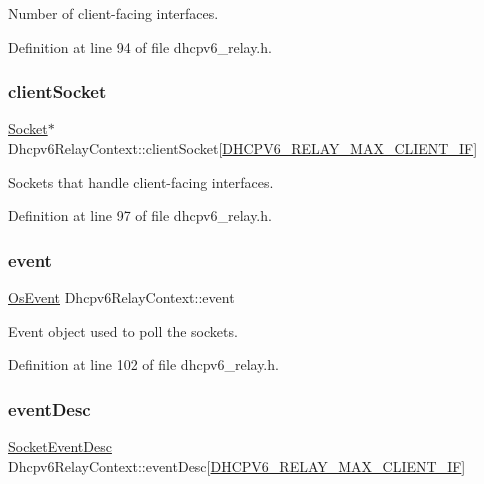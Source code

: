 Number of client-\/facing interfaces. 



Definition at line 94 of file dhcpv6\+\_\+relay.\+h.

\mbox{\label{structDhcpv6RelayContext_a356e927a8bf2bd0e9f434759945ea9c7}} 
\subsubsection{\texorpdfstring{client\+Socket}{clientSocket}}
{\footnotesize\ttfamily \hyperlink{socket_8h_aa85acfb0fa336ef495e6ba87fb88fc48}{Socket}$\ast$ Dhcpv6\+Relay\+Context\+::client\+Socket\mbox{[}\hyperlink{dhcpv6__relay_8h_a588f9db9b4638a3b196e1421ab1bf6dc}{D\+H\+C\+P\+V6\+\_\+\+R\+E\+L\+A\+Y\+\_\+\+M\+A\+X\+\_\+\+C\+L\+I\+E\+N\+T\+\_\+\+IF}\mbox{]}}



Sockets that handle client-\/facing interfaces. 



Definition at line 97 of file dhcpv6\+\_\+relay.\+h.

\mbox{\label{structDhcpv6RelayContext_a0db53b8fcf50ef4cb5067a6af954c659}} 
\subsubsection{\texorpdfstring{event}{event}}
{\footnotesize\ttfamily \hyperlink{structOsEvent}{Os\+Event} Dhcpv6\+Relay\+Context\+::event}



Event object used to poll the sockets. 



Definition at line 102 of file dhcpv6\+\_\+relay.\+h.

\mbox{\label{structDhcpv6RelayContext_a932752b59e55fb44d4151e350fbd09be}} 
\subsubsection{\texorpdfstring{event\+Desc}{eventDesc}}
{\footnotesize\ttfamily \hyperlink{structSocketEventDesc}{Socket\+Event\+Desc} Dhcpv6\+Relay\+Context\+::event\+Desc\mbox{[}\hyperlink{dhcpv6__relay_8h_a588f9db9b4638a3b196e1421ab1bf6dc}{D\+H\+C\+P\+V6\+\_\+\+R\+E\+L\+A\+Y\+\_\+\+M\+A\+X\+\_\+\+C\+L\+I\+E\+N\+T\+\_\+\+IF}\mbox{]}}



